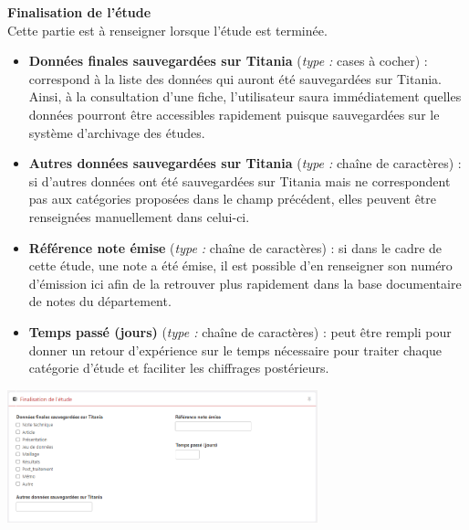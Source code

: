 \textbf{Finalisation de l'étude}\\
Cette partie est à renseigner lorsque l'étude est terminée.
\begin{itemize}[label=$\Rightarrow$, font=\LARGE]
   \item \textbf{Données finales sauvegardées sur Titania} (\textit{type :} cases à cocher) :  correspond à la liste des données qui auront été sauvegardées sur Titania. Ainsi, à la consultation d'une fiche, l'utilisateur saura immédiatement quelles données pourront être accessibles rapidement puisque sauvegardées sur le système d'archivage des études.
   \item \textbf{Autres données sauvegardées sur Titania} (\textit{type :} chaîne de caractères) : si d'autres données ont été sauvegardées sur Titania mais ne correspondent pas aux catégories proposées dans le champ précédent, elles peuvent être renseignées manuellement dans celui-ci.
\end{itemize}
\begin{minipage}[c]{0.45\linewidth}

\begin{itemize}[label=$\Rightarrow$, font=\LARGE]
   \item \textbf{Référence note émise} (\textit{type :} chaîne de caractères) : si dans le cadre de cette étude, une note a été émise, il est possible d'en renseigner son numéro d'émission ici afin de la retrouver plus rapidement dans la base documentaire de notes du département.
   \item \textbf{Temps passé (jours)} (\textit{type :} chaîne de caractères) : peut être rempli pour donner un retour d'expérience sur le temps nécessaire pour traiter chaque catégorie d'étude et faciliter les chiffrages postérieurs.
\end{itemize}

\end{minipage} \hfill
\begin{minipage}[c]{0.5\linewidth}
   \includegraphics[width=9cm]{pictures/GEA-finalisation.png}\vspace*{0.2cm}

\end{minipage}

